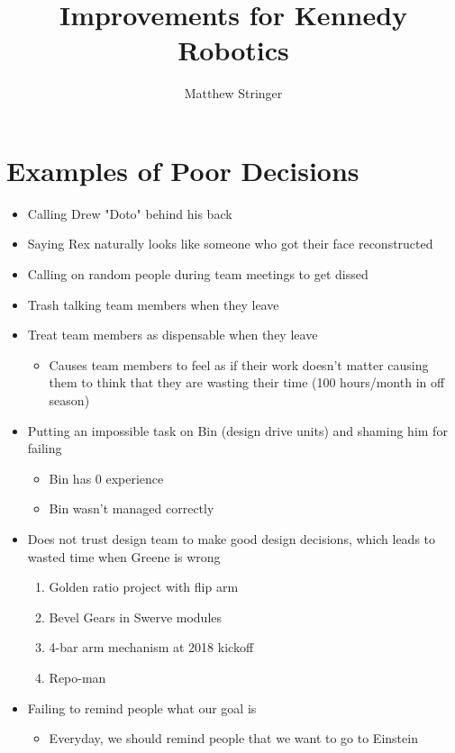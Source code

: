 \documentclass[12pt]{article}
\title{Improvements for Kennedy Robotics} %
\author{Matthew Stringer} %
\theoremstyle{break}
\numberwithin{theorem}{subsection}
\numberwithin{lemma}{subsection}
\numberwithin{corollary}{subsection}
\numberwithin{equation}{subsection}
\begin{document}
\maketitle

\section{Examples of Poor Decisions}
\begin{itemize}
	\item Calling Drew "Doto" behind his back
	\item Saying Rex naturally looks like someone who got their face reconstructed
	\item Calling on random people during team meetings to get dissed
	\item Trash talking team members when they leave
	\item Treat team members as dispensable when they leave
	\begin{itemize}
		\item Causes team members to feel as if their work doesn't matter causing them to think that
			they are wasting their time (100 hours/month in off season)
	\end{itemize}
	\item Putting an impossible task on Bin (design drive units) and shaming him for failing
	\begin{itemize}
		\item Bin has 0 experience 
		\item Bin wasn't managed correctly
	\end{itemize}
	\item Does not trust design team to make good design decisions, which leads to wasted time when
		Greene is wrong
	\begin{enumerate}
		\item Golden ratio project with flip arm
		\item Bevel Gears in Swerve modules
		\item 4-bar arm mechanism at 2018 kickoff 
		\item Repo-man
	\end{enumerate}
	\item Failing to remind people what our goal is
	\begin{itemize}
		\item Everyday, we should remind people that we want to go to Einstein
	\end{itemize}
\end{itemize}
\end{document}
